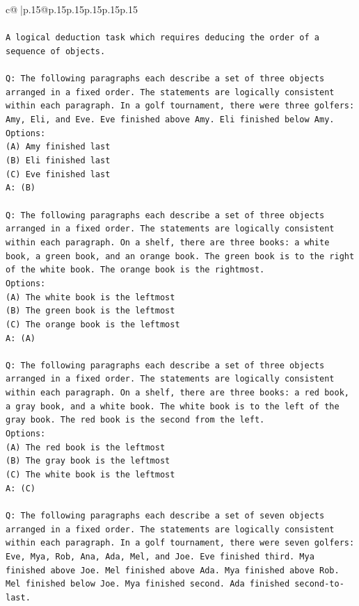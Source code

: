 \documentclass{article}
\begin{document}
{\begin{supertabular}{c@{$\;$}|p{.15\linewidth}@{}p{.15\linewidth}p{.15\linewidth}p{.15\linewidth}p{.15\linewidth}p{.15\linewidth}}
{{{\\ 
\\ 
\texttt{A logical deduction task which requires deducing the order of a sequence of objects.} \\
\\ 
\texttt{Q: The following paragraphs each describe a set of three objects arranged in a fixed order. The statements are logically consistent within each paragraph. In a golf tournament, there were three golfers: Amy, Eli, and Eve. Eve finished above Amy. Eli finished below Amy.} \\
\texttt{Options:} \\
\texttt{(A) Amy finished last} \\
\texttt{(B) Eli finished last} \\
\texttt{(C) Eve finished last} \\
\texttt{A: (B)} \\
\\ 
\texttt{Q: The following paragraphs each describe a set of three objects arranged in a fixed order. The statements are logically consistent within each paragraph. On a shelf, there are three books: a white book, a green book, and an orange book. The green book is to the right of the white book. The orange book is the rightmost.} \\
\texttt{Options:} \\
\texttt{(A) The white book is the leftmost} \\
\texttt{(B) The green book is the leftmost} \\
\texttt{(C) The orange book is the leftmost} \\
\texttt{A: (A)} \\
\\ 
\texttt{Q: The following paragraphs each describe a set of three objects arranged in a fixed order. The statements are logically consistent within each paragraph. On a shelf, there are three books: a red book, a gray book, and a white book. The white book is to the left of the gray book. The red book is the second from the left.} \\
\texttt{Options:} \\
\texttt{(A) The red book is the leftmost} \\
\texttt{(B) The gray book is the leftmost} \\
\texttt{(C) The white book is the leftmost} \\
\texttt{A: (C)} \\
\\ 
\texttt{Q: The following paragraphs each describe a set of seven objects arranged in a fixed order. The statements are logically consistent within each paragraph. In a golf tournament, there were seven golfers: Eve, Mya, Rob, Ana, Ada, Mel, and Joe. Eve finished third. Mya finished above Joe. Mel finished above Ada. Mya finished above Rob. Mel finished below Joe. Mya finished second. Ada finished second{-}to{-}last.} \\
}}}
\end{supertabular}}
\end{document}
